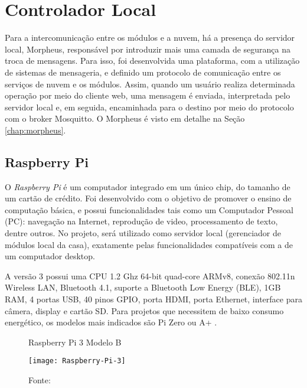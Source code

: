 \section{Controlador Local}
Para a intercomunicação entre os módulos e a nuvem, há a presença do servidor local, Morpheus, responsável por introduzir mais uma camada de segurança na troca de mensagens. Para isso, foi desenvolvida uma plataforma, com a utilização de sistemas de mensageria, e definido um protocolo de comunicação entre os serviços de nuvem e os módulos. Assim, quando um usuário realiza determinada operação por meio do cliente web, uma mensagem é enviada, interpretada pelo servidor local e, em seguida, encaminhada para o destino por meio do protocolo \wmqtt{} com o broker Mosquitto. O Morpheus é visto em detalhe na Seção \ref{chap:morpheus}.

\subsection{Raspberry Pi}
O \emph{Raspberry Pi} é um computador integrado em um único chip, do tamanho de um cartão de crédito. Foi desenvolvido com o objetivo de promover o ensino de computação básica, e possui funcionalidades tais como um Computador Pessoal (PC): navegação na Internet, reprodução de video, processamento de texto, dentre outros. No projeto, será utilizado como servidor local (gerenciador de módulos local da casa), exatamente pelas funcionalidades compatíveis com a de um computador desktop.

A versão 3 possui uma CPU 1.2 Ghz 64-bit quad-core ARMv8, conexão 802.11n Wireless LAN, Bluetooth 4.1, suporte a Bluetooth Low Energy (BLE), 1GB RAM, 4 portas USB, 40 pinos GPIO, porta HDMI, porta Ethernet, interface para câmera, display e cartão SD. Para projetos que necessitem de baixo consumo energético, os modelos mais indicados são Pi Zero ou A+ \cite{raspPi}.

\begin{figure}[H]
	\centering
	\caption{Raspberry Pi 3 Modelo B}
  \texttt{[image: Raspberry-Pi-3]}
	\caption*{Fonte: \cite{raspPi}}
\label{fig:Raspberry-Pi-3}
\end{figure}
